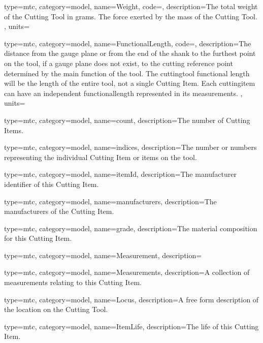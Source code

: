 {
  type=mtc,
  category=model,
  name={Weight},
  code=,
  description={The total weight of the Cutting Tool in grams. The force exerted by the mass of the Cutting Tool. },
  units=
}


{
  type=mtc,
  category=model,
  name={FunctionalLength},
  code=,
  description={The distance from the gauge plane or from the end of the shank to the furthest point on the tool, if a gauge plane does not exist, to the cutting reference point determined by the main function of the tool. The \gls{cuttingtool} functional length will be the length of the entire tool, not a single Cutting Item. Each \gls{cuttingitem} can have an independent \gls{functionallength} represented in its measurements. },
  units=
}


{
  type=mtc,
  category=model,
  name={count},
  description={The number of Cutting Items. }
}


{
  type=mtc,
  category=model,
  name={indices},
  description={The number or numbers representing the individual Cutting Item or items on the tool. }
}


{
  type=mtc,
  category=model,
  name={itemId},
  description={The manufacturer identifier of this Cutting Item. }
}


{
  type=mtc,
  category=model,
  name={manufacturers},
  description={The manufacturers of the Cutting Item. }
}


{
  type=mtc,
  category=model,
  name={grade},
  description={The material composition for this Cutting Item.}
}


{
  type=mtc,
  category=model,
  name={Measurement},
  description={}
}

{
  type=mtc,
  category=model,
  name={Measurements},
  description={A collection of measurements relating to this Cutting Item.}
}


{
  type=mtc,
  category=model,
  name={Locus},
  description={A free form description of the location on the Cutting Tool.}
}


{
  type=mtc,
  category=model,
  name={ItemLife},
  description={The life of this Cutting Item.}
}


